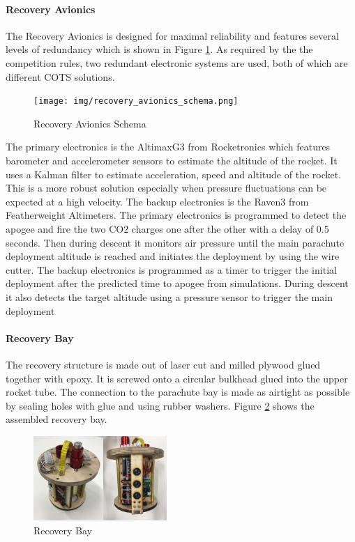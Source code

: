  \paragraph{Recovery Avionics}
 \hfill \break
The Recovery Avionics is designed for maximal reliability and features several levels of redundancy which is shown in Figure \ref{f:recovery_avionics_schema}. As required by the the competition rules, two redundant electronic systems are used, both of which are different COTS solutions.
  \begin{figure}[h!]
    \centering
        \texttt{[image: img/recovery\_avionics\_schema.png]}
        \caption{Recovery Avionics Schema}
        \label{f:recovery_avionics_schema}
 \end{figure}
The primary electronics is the AltimaxG3 from Rocketronics which features barometer and accelerometer sensors to estimate the altitude of the rocket. It uses a Kalman filter to estimate acceleration, speed and altitude of the rocket. This is a more robust solution especially when pressure fluctuations can be expected at a high velocity.
The backup electronics is the Raven3 from Featherweight Altimeters.
The primary electronics is programmed to detect the apogee and fire the two CO2 charges one after the other with a delay of 0.5 seconds. Then during descent it monitors air pressure until the main parachute deployment altitude is reached and initiates the deployment by using the wire cutter.
The backup electronics is programmed as a timer to trigger the initial deployment after the predicted time to apogee from simulations. During descent it also detects the target altitude using a pressure sensor to trigger the main deployment


\paragraph{Recovery Bay}
 The recovery structure is made out of laser cut and milled plywood glued together with epoxy. It is screwed onto a circular bulkhead glued into the upper rocket tube. The connection to the parachute bay is made as airtight as possible by sealing holes with glue and using rubber washers.
Figure \ref{f:recovery_bay} shows the assembled recovery bay.
 \begin{figure}[h!]
 	\centering
        \includegraphics[width=0.45\textwidth]{img/recovery_bay.jpg}
        \caption{Recovery Bay}
        \label{f:recovery_bay}
 \end{figure}



